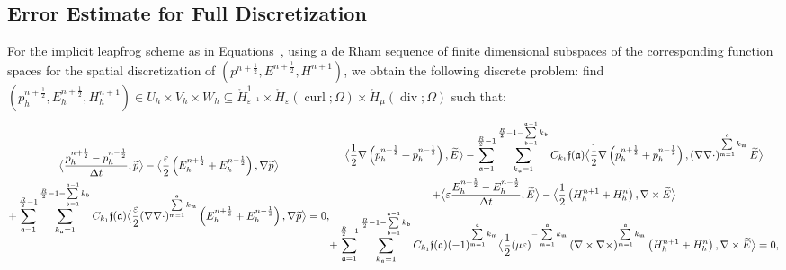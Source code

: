 \documentclass{amsart}
\theoremstyle{thmstyleone}%
\theoremstyle{thmstyletwo}%
\theoremstyle{thmstylethree}%
\DeclareMathOperator{\curl}{curl}
\def\divgn{\operatorname{div}}
\newcommand{\aInnerproduct}[2]{\bigl\langle #1, #2 \bigr\rangle}
\begin{document}
\subsection{Error Estimate for Full Discretization}
For the implicit leapfrog scheme as in Equations~, using a de Rham sequence of finite dimensional subspaces of the corresponding function spaces for the spatial discretization of $(p^{n + \frac{1}{2}}, E^{n + \frac{1}{2}}, H^{n + 1})$, we obtain the following discrete problem: find $(p_h^{n + \frac{1}{2}}, E_h^{n + \frac{1}{2}}, H_h^{n + 1}) \in U_h \times V_h \times W_h \subseteq \mathring{H}_{\varepsilon^{-1}}^1 \times \mathring{H}_{\varepsilon}(\curl; \Omega) \times \mathring{H}_{\mu}(\divgn; \Omega)$ such that:
\begin{subequations}
\begin{multline}
  \aInnerproduct{\dfrac{p_h^{n + \frac{1}{2}} - p_h^{n - \frac{1}{2}}}{\Delta t}}{\widetilde{p}} - \aInnerproduct{\dfrac{\varepsilon}{2} \left( E_h^{n + \frac{1}{2}} + E_h^{n - \frac{1}{2}} \right)}{\nabla \widetilde{p}} \\ + \sum\limits_{\mathfrak{a} = 1}^{\frac{R}{2} - 1} \sum\limits_{k_\mathfrak{a} = 1}^{\frac{R}{2} - 1 - \sum\limits_{\mathfrak{b} = 1}^{\mathfrak{a} - 1} k_\mathfrak{b}} C_{k_1} \mathfrak{f}(\mathfrak{a}) \aInnerproduct{\dfrac{\varepsilon}{2} (\nabla \nabla \cdot)^{\sum\limits_{\mathfrak{m} = 1}^\mathfrak{a} k_\mathfrak{m}} \left( E_h^{n + \frac{1}{2}} + E_h^{n - \frac{1}{2}} \right)}{\nabla \widetilde{p}} =0, \label{eqn:maxwell_p_lfR_full}
  \end{multline} \\
  \begin{multline}
   \aInnerproduct{\dfrac{1}{2} \nabla \left(p_h^{n + \frac{1}{2}} + p_h^{n - \frac{1}{2}} \right)}{\widetilde{E}} - \sum\limits_{\mathfrak{a} = 1}^{\frac{R}{2} - 1} \sum\limits_{k_\mathfrak{a} = 1}^{\frac{R}{2} - 1 - \sum\limits_{\mathfrak{b} = 1}^{\mathfrak{a} - 1} k_\mathfrak{b}} C_{k_1} \mathfrak{f}(\mathfrak{a}) \aInnerproduct{\dfrac{1}{2} \nabla \left(p_h^{n + \frac{1}{2}} + p_h^{n - \frac{1}{2}} \right)}{\left( \nabla \nabla \cdot \right)^{\sum\limits_{\mathfrak{m} = 1}^\mathfrak{a} k_\mathfrak{m}} \widetilde{E}} \\ + \aInnerproduct{\varepsilon \dfrac{E_h^{n + \frac{1}{2}} - E_h^{n - \frac{1}{2}}}{\Delta t}}{\widetilde{E}} -  \aInnerproduct{\dfrac{1}{2} \left( H_h^{n + 1} + H_h^n \right)}{\nabla \times \widetilde{E}} \\  + \sum\limits_{\mathfrak{a} = 1}^{\frac{R}{2} - 1} \sum\limits_{k_\mathfrak{a} = 1}^{\frac{R}{2} - 1 - \sum\limits_{\mathfrak{b} = 1}^{\mathfrak{a} - 1} k_\mathfrak{b}} C_{k_1} \mathfrak{f}( \mathfrak{a}) (-1)^{\sum\limits_{\mathfrak{m} = 1}^\mathfrak{a} k_\mathfrak{m}} \aInnerproduct{\dfrac{1}{2} ( \mu \varepsilon )^{-\sum\limits_{\mathfrak{m} = 1}^\mathfrak{a} k_\mathfrak{m}} \left( \nabla \times \nabla \times \right)^{\sum\limits_{\mathfrak{m} = 1}^\mathfrak{a} k_\mathfrak{m}} \left( H_h^{n + 1} + H_h^n \right)}{\nabla \times \widetilde{E}} = 0, \label{eqn:maxwell_E_lfR_full} 

\end{multline}
\end{subequations}
\end{document}
